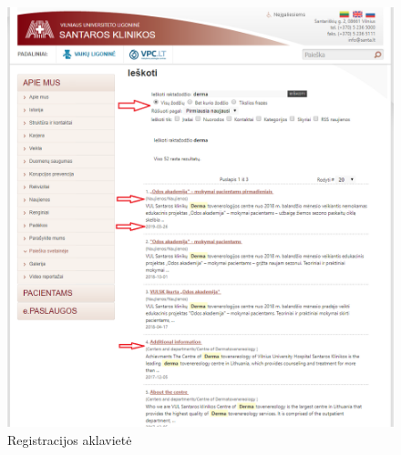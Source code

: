 \documentclass{VUMIFPSkursinis}
\begin{document}
\begin{figure}[H]
    \centering
    \includegraphics[scale=0.6]{img/PaieškaRezultatai}
    \caption{Registracijos aklavietė}
    \label{img:paieškarez}
\end{figure}


\end{document}
